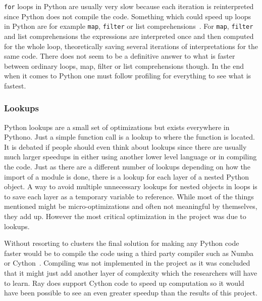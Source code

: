 \documentclass[12pt, a4paper]{article}
\begin{document}
\texttt{for} loops in Python are usually very slow because each iteration is reinterpreted since Python does not compile the code.
Something which could speed up loops in Python are for example \texttt{map}, \texttt{filter} or list comprehensions~\cite{Py:map, Py:filter, Py:listComprehension}. 
For \texttt{map}, \texttt{filter} and list comprehensions the expressions are interpreted once and then computed for the whole loop, theoretically saving several iterations of interpretations for the same code.
There does not seem to be a definitive answer to what is faster between ordinary loops, map, filter or list comprehensions though.
In the end when it comes to Python one must follow profiling for everything to see what is fastest.

\subsubsection{Lookups}

Python lookups are a small set of optimizations but exists everywhere in Pythono.
Just a simple function call is a lookup to where the function is located.
It is debated if people should even think about lookups since there are usually much larger speedups in either using another lower level language or in compiling the code.
Just as there are a different number of lookups depending on how the import of a module is done, there is a lookup for each layer of a nested Python object.
A way to avoid multiple unnecessary lookups for nested objects in loops is to save each layer as a temporary variable to reference.
While most of the things mentioned might be micro-optimizations and often not meaningful by themselves, they add up.
However the most critical optimization in the project was due to lookups.

Without resorting to clusters the final solution for making any Python code faster would be to compile the code using a third party compiler such as Numba or Cython~\cite{matEval}.
Compiling was not implemented in the project as it was concluded that it might just add another layer of complexity which the researchers will have to learn.
Ray does support Cython code to speed up computation so it would have been possible to see an even greater speedup than the results of this project.
\end{document}
